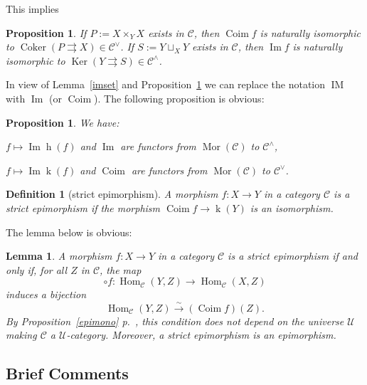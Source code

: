 \documentclass[12pt]{article}
\newtheorem{lem}[thm]{Lemma}
\newtheorem{prop}[thm]{Proposition}
\newtheorem{df}[thm]{Definition}
\theoremstyle{remark}
\theoremstyle{definition}
\newcommand{\C}{\mathcal C}
\newcommand{\U}{\mathcal U}
\newcommand{\parar}{\rightrightarrows}
\newcommand{\xr}{\xrightarrow}
\DeclareMathOperator{\Coim}{Coim}
\DeclareMathOperator{\Coker}{Coker}
\DeclareMathOperator{\Ima}{Im}
\DeclareMathOperator{\IM}{IM}
\DeclareMathOperator{\hy}{h}
\DeclareMathOperator{\ky}{k}
\DeclareMathOperator{\Hom}{Hom}
\DeclareMathOperator{\Ker}{Ker}
\DeclareMathOperator{\Mor}{Mor}
\begin{document}
This implies 

\begin{prop}\label{coimim}
If $P:=X\times_YX$ exists in $\C$, then $\Coim f$ is naturally isomorphic to $\Coker(P\parar X)\in\C^\vee$. If $S:=Y\sqcup_XY$ exists in $\C$, then $\Ima f$ is naturally isomorphic to $\Ker(Y\parar S)\in\C^\wedge$. 
\end{prop} 

In view of Lemma~\ref{imset} and Proposition~\ref{coimim} we can replace the notation $\IM$ with $\Ima$ (or $\Coim$). The following proposition is obvious: 

\begin{prop}\label{fun}
We have: 

$f\mapsto\Ima\hy(f)$ and $\Ima$ are functors from $\Mor(\C)$ to $\C^\wedge$, 

$f\mapsto\Ima\ky(f)$ and $\Coim$ are functors from $\Mor(\C)$ to $\C^\vee$. 
\end{prop}

\begin{df}[strict epimorphism] 
A morphism $f:X\to Y$ in a category $\C$ is a {\em strict epimorphism} if the morphism $\Coim f\to\ky(Y)$ is an isomorphism.
\end{df} 

The lemma below is obvious:

\begin{lem}\label{strepi}
A morphism $f:X\to Y$ in a category $\C$ is a strict epimorphism if and only if, for all $Z$ in $\C$, the map 
$$
\circ f:\Hom_\C(Y,Z)\to\Hom_\C(X,Z)
$$ 
induces a bijection 
$$
\Hom_\C(Y,Z)\xr\sim(\Coim f)(Z).
$$ 
By Proposition~\ref{epimono} p.~\pageref{epimono}, this condition does not depend on the universe $\U$ making $\C$ a $\U$-category. Moreover, a strict epimorphism is an epimorphism. 
\end{lem} 


\subsection{Brief Comments}
\end{document}
